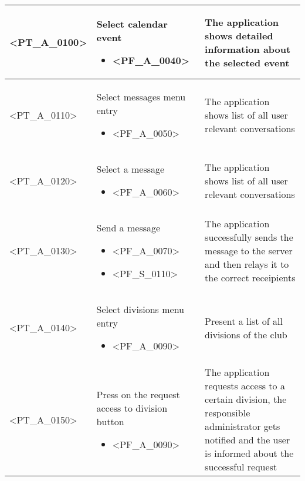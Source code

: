 \begin{longtable} {| p{} | p{} | p{} |}
    <PT\_A\_0100> & 
    Select calendar event
        \begin{itemize}
            \item <PF\_A\_0040>
        \end{itemize} & 
    The application shows detailed information about the selected event \\ \hline
    
    <PT\_A\_0110> & 
    Select messages menu entry
        \begin{itemize}
            \item <PF\_A\_0050>
        \end{itemize} & 
    The application shows list of all user relevant conversations \\ \hline
    
    <PT\_A\_0120> & 
    Select a message
        \begin{itemize}
            \item <PF\_A\_0060>
        \end{itemize} & 
    The application shows list of all user relevant conversations \\ \hline
    
    <PT\_A\_0130> & 
    Send a message
        \begin{itemize}
            \item <PF\_A\_0070>
            \item <PF\_S\_0110>
        \end{itemize} & 
    The application successfully sends the message to the server and then relays it to the correct receipients \\ \hline
    
    <PT\_A\_0140> & 
    Select divisions menu entry
        \begin{itemize}
            \item <PF\_A\_0090>
        \end{itemize} & 
    Present a list of all divisions of the club \\ \hline
    
    <PT\_A\_0150> & 
    Press on the request access to division button
        \begin{itemize}
            \item <PF\_A\_0090>
        \end{itemize} & 
    The application requests access to a certain division, the responsible administrator gets notified and the user is informed about the successful request\\ \hline
    

\end{longtable}
